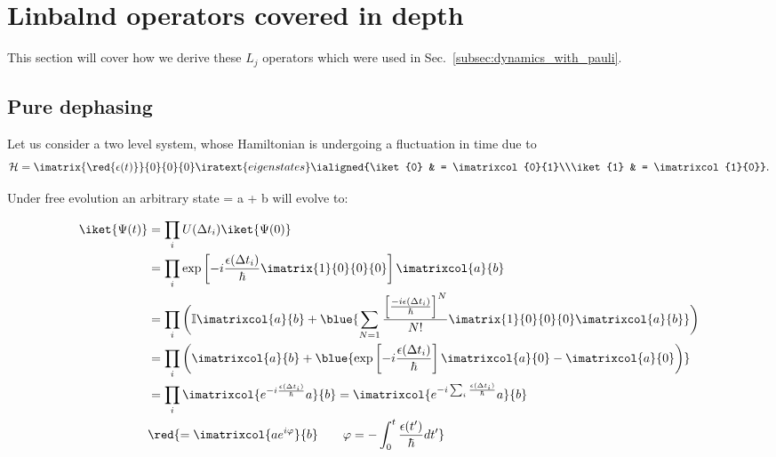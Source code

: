 
\section{Linbalnd operators covered in depth\label{sec:linbland2}}
This  section  will  cover  how  we  derive  these $  L_j  $  operators  which  were  used  in
Sec.~\ref{subsec:dynamics_with_pauli}.
\subsection{Pure dephasing\label{sec:lin_1}}
Let us consider a two level system, whose  Hamiltonian is undergoing a fluctuation in time due
to 
\begin{equation}\label{eq:lin_2}
  \mathcal{H} = \imatrix{\red{\epsilon(t)}}{0}{0}{0} \iratext{eigenstates} \ialigned{\iket{0} & = \imatrixcol{0}{1}\\\iket{1} & = \imatrixcol{1}{0}}.
\end{equation}
  
\noindent Under  free evolution an  arbitrary state   = a +  b will
evolve to:
  
\begin{equation}\label{eq:lin_3}
  \begin{aligned}
    \iket{\Psi(t)} & = \prod_i U(\Delta t_i) \iket{\Psi(0)} \\
    & = \prod_i \exp\left[-i\frac{\epsilon(\Delta t_i)}{\hbar} \imatrix{1}{0}{0}{0}\right]\imatrixcol{a}{b}\\
    & = \prod_i \bigg(\mathbb{I}\imatrixcol{a}{b} + \blue{\sum_{{N = 1}}\frac{\left[\frac{-i\epsilon(\Delta t_i)}{\hbar}\right]^N}{N!} \imatrix{1}{0}{0}{0}\imatrixcol{a}{b}}\bigg)\\
    & = \prod_i \bigg(\imatrixcol{a}{b} + \blue{\exp\left[-i\frac{\epsilon(\Delta t_i)}{\hbar}\right]\imatrixcol{a}{0} - \imatrixcol{a}{0}\bigg)}\\
    & = \prod_i \imatrixcol{e^{-i\frac{\epsilon(\Delta t_i)}{\hbar}}a}{b} = \imatrixcol{e^{-i\sum_i\frac{\epsilon(\Delta t_i)}{\hbar}}a}{b} \\
    & \red{= \imatrixcol{ae^{i\varphi}}{b} \qquad \varphi = -\int_{0}^{t}\frac{\epsilon(t')}{\hbar}dt'}
  \end{aligned}
\end{equation}
 
 

